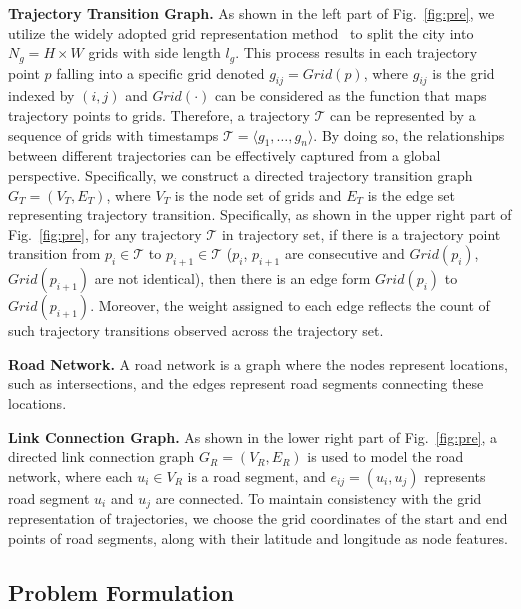 \noindent \textbf{Trajectory Transition Graph.} As shown in the left part of Fig.~\ref{fig:pre}, we utilize the widely adopted grid representation method~\cite{graphmm, mtrajrec, deeptrajrec} to split the city into $N_g = H \times W$ grids with side length $l_g$. This process results in each trajectory point $p$ falling into a specific grid denoted $g_{ij} = Grid(p)$, where $g_{ij}$ is the grid indexed by $(i,j)$ and $Grid(\cdot)$ can be considered as the function that maps trajectory points to grids. Therefore, a trajectory $\mathcal{T}$ can be represented by a sequence of grids with timestamps $\mathcal{T}=\langle g_1, \ldots, g_n \rangle$. By doing so, the relationships between different trajectories can be effectively captured from a global perspective. Specifically, we construct a directed trajectory transition graph $G_T=(V_T,E_T)$, where $V_T$ is the node set of grids and $E_T$ is the edge set representing trajectory transition. Specifically, as shown in the upper right part of Fig.~\ref{fig:pre}, for any trajectory $\mathcal{T}$ in trajectory set, if there is a trajectory point transition from $p_i \in \mathcal{T}$ to $p_{i+1} \in \mathcal{T}$ ($p_i$, $p_{i+1}$ are consecutive and $Grid(p_i)$, $Grid(p_{i+1})$ are not identical), then there is an edge form $Grid(p_i)$ to $Grid(p_{i+1})$. Moreover, the weight assigned to each edge reflects the count of such trajectory transitions observed across the trajectory set.

\noindent \textbf{Road Network.} A road network is a graph where the nodes represent locations, such as intersections, and the edges represent road segments connecting these locations.

\noindent \textbf{Link Connection Graph.} As shown in the lower right part of Fig.~\ref{fig:pre}, a directed link connection graph $G_R=(V_R,E_R)$ is used to model the road network, where each $u_i \in V_R$ is a road segment, and $e_{ij} = (u_i,u_j)$ represents road segment $u_i$ and $u_j$ are connected. To maintain consistency with the grid representation of trajectories, we choose the grid coordinates of the start and end points of road segments, along with their latitude and longitude as node features.

\subsection{Problem Formulation}

